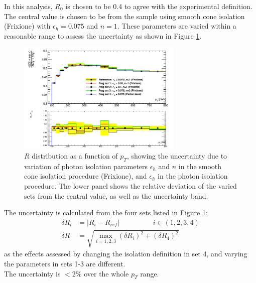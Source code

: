 \documentclass[11pt,a4paper,openright,twoside]{report}
\begin{document}
In this analysis, $R_0$ is chosen to be 0.4 to agree with the experimental definition. The central value is chosen to be from the sample using smooth cone isolation (Frixione) with $\epsilon_h = 0.075$ and $n=1$. These parameters are varied within a reasonable range to assess the uncertainty as shown in Figure \ref{fig:photon_frag}.

\begin{figure}[H]
\centering
	\includegraphics[width=0.7\textwidth]{frag.png}
	\caption{$R$ distribution as a function of $p_T$, showing the uncertainty due to variation of photon isolation parameters $\epsilon_h$ and $n$ in the smooth cone isolation procedure (Frixione), and $\epsilon_h$ in the photon isolation procedure. The lower panel shows the relative deviation of the varied sets from the central value, as well as the uncertainty band.}
	\label{fig:photon_frag}
\end{figure}

The uncertainty is calculated from the four sets listed in Figure \ref{fig:photon_frag}:
\begin{equation}
\begin{split}
\delta R_i &= |R_i - R_{ref}| \hspace{2cm}  i \in (1,2,3,4)\\
\delta R &= \sqrt{\max_{i=1,2,3}(\delta R_i)^2 + (\delta R_4)^2}
\end{split}
\end{equation}
as the effects assessed by changing the isolation definition in set 4, and varying the parameters in sets 1-3 are different.\\
The uncertainty is $< 2\%$ over the whole $p_T$ range.
\end{document}
